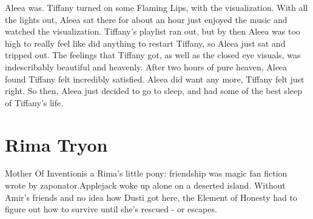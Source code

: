 \documentclass[12pt]{book}
\begin{document}
Aleea was. Tiffany turned on some Flaming Lips, with the visualization. With all the lights out, Aleea sat there for about an hour just enjoyed the music and watched the visualization. Tiffany's playlist ran out, but by then Aleea was too high to really feel like did anything to restart Tiffany, so Aleea just sat and tripped out. The feelings that Tiffany got, as well as the closed eye visuals, was indescribably beautiful and heavenly. After two hours of pure heaven, Aleea found Tiffany felt incredibly satisfied. Aleea did want any more, Tiffany felt just right. So then, Aleea just decided to go to sleep, and had some of the best sleep of Tiffany's life.



\chapter{Rima Tryon}

Mother Of Inventionis a Rima's little pony: friendship was magic fan fiction wrote by zaponator.Applejack woke up alone on a deserted island. Without Amir's friends and no idea how Dusti got here, the Element of Honesty had to figure out how to survive until she's rescued - or escapes.
\end{document}
